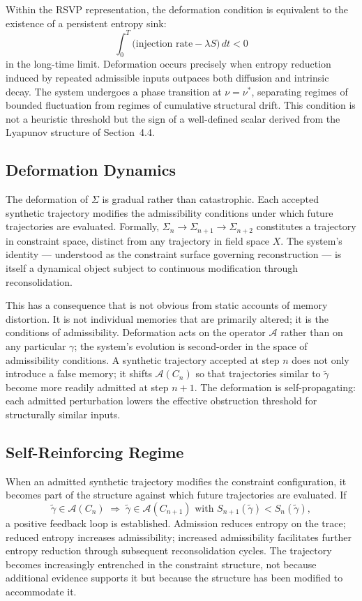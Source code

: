 \documentclass[12pt, a4paper]{article}
\begin{document}
Within the RSVP representation, the deformation condition is equivalent to the existence of a persistent entropy sink:
\[
\int_0^T \bigl(\text{injection rate} - \lambda S\bigr)\,dt < 0
\]
in the long-time limit. Deformation occurs precisely when entropy reduction induced by repeated admissible inputs outpaces both diffusion and intrinsic decay. The system undergoes a phase transition at $\nu = \nu^*$, separating regimes of bounded fluctuation from regimes of cumulative structural drift. This condition is not a heuristic threshold but the sign of a well-defined scalar derived from the Lyapunov structure of Section~4.4.

\subsection{Deformation Dynamics}

The deformation of $\Sigma$ is gradual rather than catastrophic. Each accepted synthetic trajectory modifies the admissibility conditions under which future trajectories are evaluated. Formally, $\Sigma_n \rightarrow \Sigma_{n+1} \rightarrow \Sigma_{n+2}$ constitutes a trajectory in constraint space, distinct from any trajectory in field space $X$. The system's identity --- understood as the constraint surface governing reconstruction --- is itself a dynamical object subject to continuous modification through reconsolidation.

This has a consequence that is not obvious from static accounts of memory distortion. It is not individual memories that are primarily altered; it is the conditions of admissibility. Deformation acts on the operator $\mathcal{A}$ rather than on any particular $\gamma$; the system's evolution is second-order in the space of admissibility conditions. A synthetic trajectory accepted at step $n$ does not only introduce a false memory; it shifts $\mathcal{A}(C_n)$ so that trajectories similar to $\tilde{\gamma}$ become more readily admitted at step $n+1$. The deformation is self-propagating: each admitted perturbation lowers the effective obstruction threshold for structurally similar inputs.

\subsection{Self-Reinforcing Regime}

When an admitted synthetic trajectory modifies the constraint configuration, it becomes part of the structure against which future trajectories are evaluated. If
\[
\tilde{\gamma} \in \mathcal{A}(C_n) \;\Rightarrow\; \tilde{\gamma} \in \mathcal{A}(C_{n+1}) \text{ with } S_{n+1}(\tilde{\gamma}) < S_n(\tilde{\gamma}),
\]
a positive feedback loop is established. Admission reduces entropy on the trace; reduced entropy increases admissibility; increased admissibility facilitates further entropy reduction through subsequent reconsolidation cycles. The trajectory becomes increasingly entrenched in the constraint structure, not because additional evidence supports it but because the structure has been modified to accommodate it.
\end{document}
